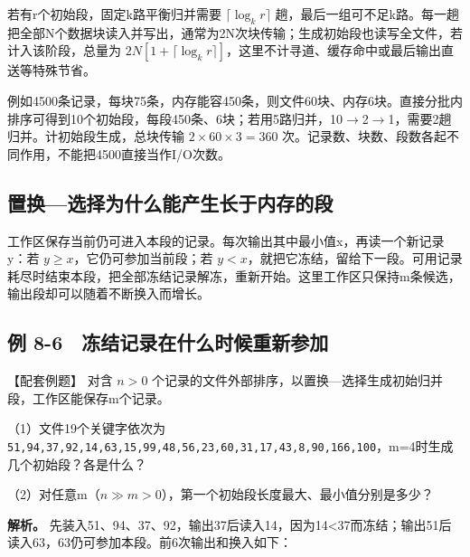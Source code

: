 若有r个初始段，固定k路平衡归并需要 \(\lceil\log_k r\rceil\) 趟，最后一组可不足k路。每一趟把全部N个数据块读入并写出，通常为2N次块传输；生成初始段也读写全文件，若计入该阶段，总量为 \(2N[1+\lceil\log_k r\rceil]\)，这里不计寻道、缓存命中或最后输出直送等特殊节省。

例如4500条记录，每块75条，内存能容450条，则文件60块、内存6块。直接分批内排序可得到10个初始段，每段450条、6块；若用5路归并，10\ensuremath{\to}2\ensuremath{\to}1，需要2趟归并。计初始段生成，总块传输 \(2\times60\times3=360\) 次。记录数、块数、段数各起不同作用，不能把4500直接当作I/O次数。

\subsection{置换---选择为什么能产生长于内存的段}\label{ux7f6eux6362ux9009ux62e9ux4e3aux4ec0ux4e48ux80fdux4ea7ux751fux957fux4e8eux5185ux5b58ux7684ux6bb5}

工作区保存当前仍可进入本段的记录。每次输出其中最小值x，再读一个新记录y：若 \(y\ge x\)，它仍可参加当前段；若 \(y<x\)，就把它冻结，留给下一段。可用记录耗尽时结束本段，把全部冻结记录解冻，重新开始。这里工作区只保持m条候选，输出段却可以随着不断换入而增长。

\subsection{例 8-6　冻结记录在什么时候重新参加}\label{DS08-ex6}

\begin{example}[配套案例]

【配套例题】 对含 \(n>0\) 个记录的文件外部排序，以置换---选择生成初始归并段，工作区能保存m个记录。

（1）文件19个关键字依次为 \texttt{51,\allowbreak{}94,\allowbreak{}37,\allowbreak{}92,\allowbreak{}14,\allowbreak{}63,\allowbreak{}15,\allowbreak{}99,\allowbreak{}48,\allowbreak{}56,\allowbreak{}23,\allowbreak{}60,\allowbreak{}31,\allowbreak{}17,\allowbreak{}43,\allowbreak{}8,\allowbreak{}90,\allowbreak{}166,\allowbreak{}100}，m=4时生成几个初始段？各是什么？

（2）对任意m（\(n\gg m>0\)），第一个初始段长度最大、最小值分别是多少？

\end{example}

\textbf{解析。} 先装入51、94、37、92，输出37后读入14，因为14\textless37而冻结；输出51后读入63，63仍可参加本段。前6次输出和换入如下：

